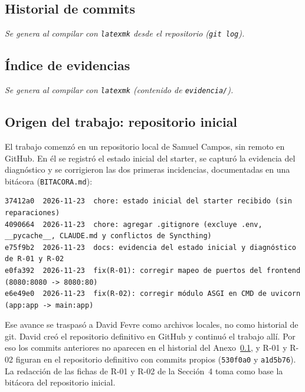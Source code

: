 \documentclass[11pt,a4paper]{article}
\newcommand{\cod}[1]{\texttt{#1}}
\begin{document}
\subsection{Historial de commits}\label{anx:historial}
  {}
  {\textit{Se genera al compilar con \cod{latexmk} desde el repositorio (\cod{git log}).}}

\subsection{Índice de evidencias}\label{anx:evidencias}
  {}
  {\textit{Se genera al compilar con \cod{latexmk} (contenido de \cod{evidencia/}).}}

\subsection{Origen del trabajo: repositorio inicial}\label{anx:origen}
El trabajo comenzó en un repositorio local de Samuel Campos, sin remoto en GitHub. En él se registró el estado inicial del starter, se capturó la evidencia del diagnóstico y se corrigieron las dos primeras incidencias, documentadas en una bitácora (\cod{BITACORA.md}):

\begin{lstlisting}[style=term]
37412a0  2026-11-23  chore: estado inicial del starter recibido (sin reparaciones)
4090664  2026-11-23  chore: agregar .gitignore (excluye .env, __pycache__, CLAUDE.md y conflictos de Syncthing)
e75f9b2  2026-11-23  docs: evidencia del estado inicial y diagnóstico de R-01 y R-02
e0fa392  2026-11-23  fix(R-01): corregir mapeo de puertos del frontend (8080:8080 -> 8080:80)
e6e49e0  2026-11-23  fix(R-02): corregir módulo ASGI en CMD de uvicorn (app:app -> main:app)
\end{lstlisting}

Ese avance se traspasó a David Fevre como archivos locales, no como historial de git. David creó el repositorio definitivo en GitHub y continuó el trabajo allí. Por eso los commits anteriores no aparecen en el historial del Anexo~\ref{anx:historial}, y R-01 y R-02 figuran en el repositorio definitivo con commits propios (\cod{530f0a0} y \cod{a1d5b76}). La redacción de las fichas de R-01 y R-02 de la Sección~4 toma como base la bitácora del repositorio inicial.
\end{document}
